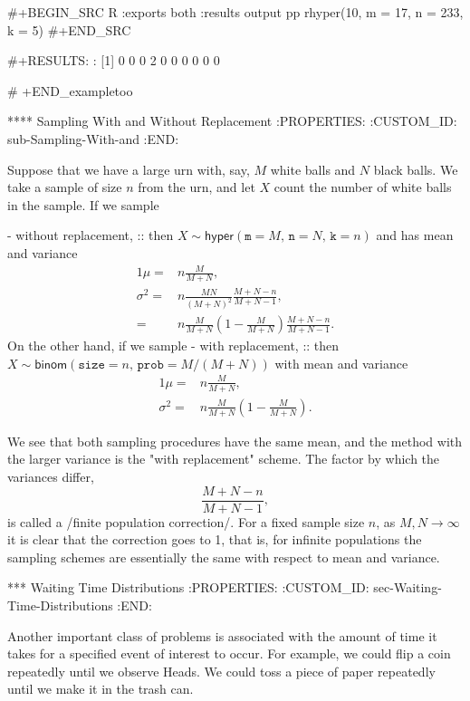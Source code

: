 {#+BEGIN_SRC R :exports both :results output pp  
rhyper(10, m = 17, n = 233, k = 5)
#+END_SRC

#+RESULTS:
:  [1] 0 0 0 2 0 0 0 0 0 0

# +END_exampletoo

**** Sampling With and Without Replacement
:PROPERTIES:
:CUSTOM_ID: sub-Sampling-With-and
:END:

Suppose that we have a large urn with, say, \(M\) white balls and
\(N\) black balls. We take a sample of size \(n\) from the urn, and
let \(X\) count the number of white balls in the sample. If we sample

- without replacement, :: then
     \(X\sim\mathsf{hyper}(\mathtt{m=}M,\,\mathtt{n}=N,\,\mathtt{k}=n)\)
     and has mean and variance
     \begin{alignat*}{1}
     \mu= & n\frac{M}{M+N},\\
     \sigma^{2}= & n\frac{MN}{(M+N)^{2}}\frac{M+N-n}{M+N-1},\\
     = & n\frac{M}{M+N}\left(1-\frac{M}{M+N}\right)\frac{M+N-n}{M+N-1}.
     \end{alignat*}
     On the other hand, if we sample
- with replacement, :: then
     \(X\sim\mathsf{binom}(\mathtt{size}=n,\,\mathtt{prob}=M/(M+N))\)
     with mean and variance
     \begin{alignat*}{1}
     \mu= & n\frac{M}{M+N},\\
     \sigma^{2}= & n\frac{M}{M+N}\left(1-\frac{M}{M+N}\right).
     \end{alignat*}

We see that both sampling procedures have the same mean, and the
method with the larger variance is the "with replacement"
scheme. The factor by which the variances differ,
\begin{equation}
\frac{M+N-n}{M+N-1},
\end{equation}
is called a /finite population correction/. For a fixed sample size
\(n\), as \(M,N\to\infty\) it is clear that the correction goes to 1,
that is, for infinite populations the sampling schemes are essentially
the same with respect to mean and variance.

*** Waiting Time Distributions
:PROPERTIES:
:CUSTOM_ID: sec-Waiting-Time-Distributions
:END:

Another important class of problems is associated with the amount of
time it takes for a specified event of interest to occur. For example,
we could flip a coin repeatedly until we observe Heads. We could toss
a piece of paper repeatedly until we make it in the trash can.

}
